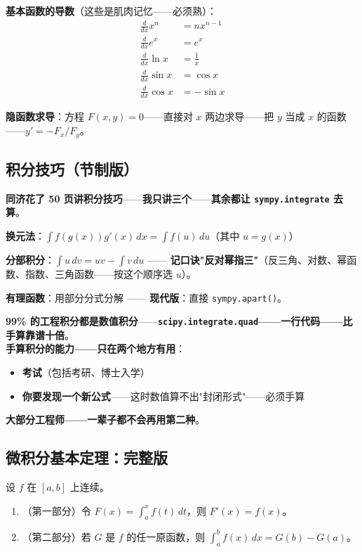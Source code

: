 \textbf{基本函数的导数}（这些是肌肉记忆——必须熟）：
\begin{align}
\frac{d}{dx}x^n &= n x^{n-1} \\
\frac{d}{dx}e^x &= e^x \\
\frac{d}{dx}\ln x &= \frac{1}{x} \\
\frac{d}{dx}\sin x &= \cos x \\
\frac{d}{dx}\cos x &= -\sin x
\end{align}

\textbf{隐函数求导}：方程 $F(x,y)=0$——直接对 $x$ 两边求导——把 $y$ 当成 $x$ 的函数——\textbf{$y' = -F_x/F_y$}。

\subsection{积分技巧（节制版）}

\textbf{同济花了 50 页讲积分技巧}——\textbf{我只讲三个}——\textbf{其余都让 \texttt{sympy.integrate} 去算}。

\textbf{换元法}：$\int f(g(x)) g'(x) \, dx = \int f(u) \, du$（其中 $u = g(x)$）

\textbf{分部积分}：$\int u \, dv = uv - \int v \, du$ —— \textbf{记口诀"反对幂指三"}（反三角、对数、幂函数、指数、三角函数——按这个顺序选 $u$）。

\textbf{有理函数}：用部分分式分解 —— \textbf{现代版}：直接 \texttt{sympy.apart()}。

\begin{remark}[工业现实]
\textbf{99\% 的工程积分都是数值积分}——\textbf{\texttt{scipy.integrate.quad}——一行代码——比手算靠谱十倍}。\\
\textbf{手算积分的能力——只在两个地方有用}：
\begin{itemize}
\item \textbf{考试}（包括考研、博士入学）
\item \textbf{你要发现一个新公式}——这时数值算不出"封闭形式"——必须手算
\end{itemize}
\textbf{大部分工程师——一辈子都不会再用第二种}。
\end{remark}

\subsection{微积分基本定理：完整版}

\begin{theorem}
设 $f$ 在 $[a,b]$ 上连续。
\begin{enumerate}
\item（第一部分）令 $F(x) = \int_a^x f(t) \, dt$，则 $F'(x) = f(x)$。
\item（第二部分）若 $G$ 是 $f$ 的任一原函数，则 $\int_a^b f(x) \, dx = G(b) - G(a)$。
\end{enumerate}
\end{theorem}

